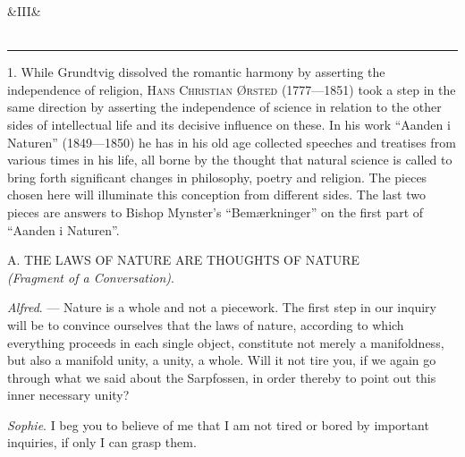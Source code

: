 \documentclass[12pt,a4paper,openany]{book}
\newcommand{\opage}[1]{\marginnote{\footnotesize\textit{[#1]}}}
\newcommand{\anthsection}[2]{\clearpage\begin{center}\ifx&#1&\else{\large #1}\\[0.6em]\fi{\Large #2}\\[0.5em]\rule{3em}{0.4pt}\end{center}\medskip}
\newcommand{\excerpthead}[1]{\par\bigskip\begin{center}#1\end{center}\nopagebreak\smallskip}
\newenvironment{intro}{\par}{\par}
\begin{document}
\setcounter{footnote}{0}%
\anthsection{III} {THE ØRSTED BROTHERS}\opage{60}

\begin{intro}

1. While Grundtvig dissolved the romantic harmony by asserting the independence of
religion, \textsc{Hans Christian} \textsc{Ørsted} (1777---1851) took a step in the
same direction by asserting the independence of science in relation to the other
sides of intellectual life and its decisive influence on these. In his work
``Aanden i Naturen'' (1849---1850) he has in his old age collected speeches and
treatises from various times in his life, all borne by the thought that natural
science is called to bring forth significant changes in philosophy, poetry and
religion. The pieces chosen here will illuminate this conception from different
sides. The last two pieces are answers to Bishop Mynster's ``Bemærkninger'' on the
first part of ``Aanden i Naturen''.
\end{intro}

\excerpthead{A. THE LAWS OF NATURE ARE THOUGHTS OF NATURE \\ \textit{(Fragment of a Conversation)}.}


\emph{Alfred}. --- Nature is a whole and not a piecework. The first step in our
inquiry will be to convince ourselves that the laws of nature, according to which
everything proceeds in each single object, constitute not merely a manifoldness, but
also a manifold unity, a unity, a whole. Will it not tire you, if we again go
through what we said about the Sarpfossen, in order thereby to point out this inner
necessary unity?

\emph{Sophie}. I beg you to believe of me that I am not tired or bored by important
inquiries, if only I can grasp them.
\end{document}
